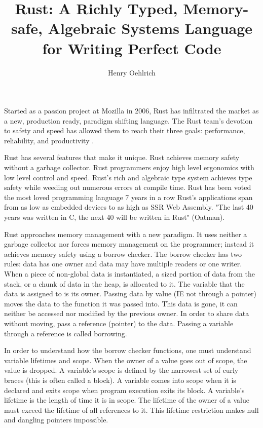 \documentclass[12pt]{article}
\author{Henry Oehlrich}
\title{Rust: A Richly Typed, Memory-safe, Algebraic Systems Language for Writing Perfect Code}
\begin{document}
\makeheader{}
\thispagestyle{empty}
\setlength{\parindent}{20pt}
Started as a passion project at Mozilla in 2006, Rust has infiltrated the
market as a new, production ready, paradigm shifting language. The Rust team's
devotion to safety and speed has allowed them to reach their three goals:
performance, reliability, and productivity \cite{rust-lang.org}.

Rust has several features that make it unique. Rust achieves memory safety
without a garbage collector. Rust programmers enjoy high level ergonomics with
low level control and speed. Rust's rich and algebraic type system achieves
type safety while weeding out numerous errors at compile time. Rust has been
voted the most loved programming language 7 years in a row \cite{so-dev-surve}
Rust's applications span from as low as embedded devices to as high as SSR Web
Assembly. "The last 40 years was written in C, the next 40 will be written in
Rust" (Oatman).


Rust approaches memory management with a new paradigm. It uses neither a
garbage collector nor forces memory management on the programmer; instead it
achieves memory safety using a borrow checker. The borrow checker has two
rules: data has one owner and data may have multiple readers or one writer.
When a piece of non-global data is instantiated, a sized portion of data from
the stack, or a chunk of data in the heap, is allocated to it. The variable
that the data is assigned to is its owner. Passing data by value (IE not
through a pointer) moves the data to the function it was passed into. This data
is gone, it can neither be accessed nor modified by the previous owner. In
order to share data without moving, pass a reference (pointer) to the data.
Passing a variable through a reference is called borrowing. 

In order to understand how the borrow checker functions, one must understand
variable lifetimes and scope. When the owner of a value goes out of scope, the
value is dropped. A variable's scope is defined by the narrowest set of curly
braces (this is often called a block). A variable comes into scope when it is
declared and exits scope when program execution exits its block. A variable's
lifetime is the length of time it is in scope. The lifetime of the owner of a
value must exceed the lifetime of all references to it. This lifetime
restriction makes null and dangling pointers impossible.
\end{document}
